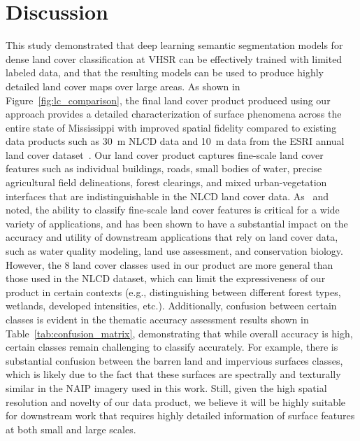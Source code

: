 \section{Discussion}\label{sec:discussion}

This study demonstrated that deep learning semantic segmentation models for dense land cover classification at VHSR can be effectively trained with limited labeled data, and that the resulting models can be used to produce highly detailed land cover maps over large areas.
As shown in Figure~\ref{fig:lc_comparison}, the final land cover product produced using our approach provides a detailed characterization of surface phenomena across the entire state of Mississippi with improved spatial fidelity compared to existing data products such as \SI{30}{\meter} NLCD data and \SI{10}{\meter} data from the ESRI annual land cover dataset~\citep{karraGlobalLandUse2021}.
Our land cover product captures fine-scale land cover features such as individual buildings, roads, small bodies of water, precise agricultural field delineations, forest clearings, and mixed urban-vegetation interfaces that are indistinguishable in the NLCD land cover data.
As~\citet{boyleHighResolutionSatelliteImagery2014} and \citet{fisherImpactSatelliteImagery2018} noted, the ability to classify fine-scale land cover features is critical for a wide variety of applications, and has been shown to have a substantial impact on the accuracy and utility of downstream applications that rely on land cover data, such as water quality modeling, land use assessment, and conservation biology.
However, the 8 land cover classes used in our product are more general than those used in the NLCD dataset, which can limit the expressiveness of our product in certain contexts (e.g., distinguishing between different forest types, wetlands, developed intensities, etc.).
Additionally, confusion between certain classes is evident in the thematic accuracy assessment results shown in Table~\ref{tab:confusion_matrix}, demonstrating that while overall accuracy is high, certain classes remain challenging to classify accurately.
For example, there is substantial confusion between the barren land and impervious surfaces classes, which is likely due to the fact that these surfaces are spectrally and texturally similar in the NAIP imagery used in this work.
Still, given the high spatial resolution and novelty of our data product, we believe it will be highly suitable for downstream work that requires highly detailed information of surface features at both small and large scales.


